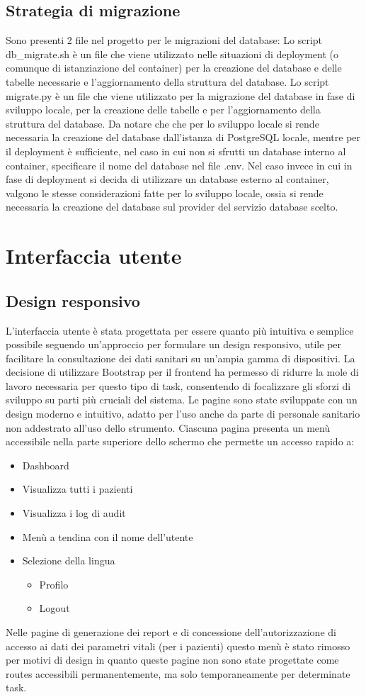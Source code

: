 \documentclass[12pt,a4paper,oneside]{report}
\begin{document}
\subsection{Strategia di migrazione}
Sono presenti 2 file nel progetto per le migrazioni del database:
Lo script db\_migrate.sh è un file che viene utilizzato nelle situazioni di deployment (o comunque di istanziazione del container) per la creazione del database e delle tabelle necessarie e l'aggiornamento della struttura del database.
Lo script migrate.py è un file che viene utilizzato per la migrazione del database in fase di sviluppo locale, per la creazione delle tabelle e per l'aggiornamento della struttura del database.
Da notare che che per lo sviluppo locale si rende necessaria la creazione del database dall'istanza di PostgreSQL locale, mentre per il deployment è sufficiente, nel caso in cui non si sfrutti un database interno al container, specificare il nome del database nel file .env.
Nel caso invece in cui in fase di deployment si decida di utilizzare un database esterno al container, valgono le stesse considerazioni fatte per lo sviluppo locale, ossia si rende necessaria la creazione del database sul provider del servizio database scelto.
\section{Interfaccia utente}
\subsection{Design responsivo}
L'interfaccia utente è stata progettata per essere quanto più intuitiva e semplice possibile seguendo un'approccio per formulare un design responsivo, utile per facilitare la consultazione dei dati sanitari su un'ampia gamma di dispositivi.
La decisione di utilizzare Bootstrap per il frontend ha permesso di ridurre la mole di lavoro necessaria per questo tipo di task, consentendo di focalizzare gli sforzi di sviluppo su parti più cruciali del sistema.
Le pagine sono state sviluppate con un design moderno e intuitivo, adatto per l'uso anche da parte di personale sanitario non addestrato all'uso dello strumento.
Ciascuna pagina presenta un menù accessibile nella parte superiore dello schermo che permette un accesso rapido a:
\begin{itemize}
    \item Dashboard
    \item Visualizza tutti i pazienti
    \item Visualizza i log di audit
    \item Menù a tendina con il nome dell'utente
    \item Selezione della lingua
    \begin{itemize}
        \item Profilo
        \item Logout
    \end{itemize}
\end{itemize}
Nelle pagine di generazione dei report e di concessione dell'autorizzazione di accesso ai dati dei parametri vitali (per i pazienti) questo menù è stato rimosso per motivi di design in quanto queste pagine non sono state progettate come routes accessibili permanentemente, ma solo temporaneamente per determinate task.
\end{document}
